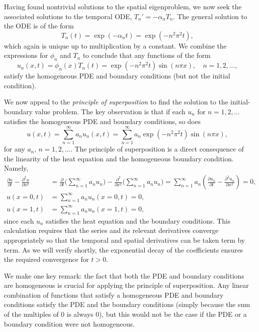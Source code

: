Having found nontrivial solutions to the spatial eigenproblem, we now seek the associated solutions to the temporal ODE, $T_n' = -\alpha_n T_n$. The general solution to the ODE is of the form
\[T_n(t) = \exp(-\alpha_n t) = \exp(-n^2\pi^2 t),\]
which again is unique up to multiplication by a constant. We combine the expressions for $\phi_n$ and $T_n$ to conclude that any functions of the form
\[u_n(x, t) = \phi_n(x) T_n(t) = \exp(-n^2\pi^2 t) \sin(n\pi x), \quad n = 1, 2, \dots,\]
satisfy the homogeneous PDE and boundary conditions (but not the initial condition).

We now appeal to the \textit{principle of superposition} to find the solution to the initial-boundary value problem. The key observation is that if each $u_n$ for $n = 1, 2, \dots$ satisfies the homogeneous PDE and boundary conditions, so does
\[u(x, t) = \sum_{n=1}^{\infty} a_n u_n(x, t) = \sum_{n=1}^{\infty} a_n \exp(-n^2\pi^2 t) \sin(n\pi x),\]
for any $a_n$, $n = 1, 2, \dots$. The principle of superposition is a direct consequence of the linearity of the heat equation and the homogeneous boundary condition. Namely,
\begin{align*}
    \frac{\partial u}{\partial t} - \frac{\partial^2 u}{\partial x^2} &= \frac{\partial}{\partial t}\Big(\sum_{n=1}^{\infty} a_n u_n\Big) - \frac{\partial^2}{\partial x^2}\Big(\sum_{n=1}^{\infty} a_n u_n\Big) = \sum_{n=1}^{\infty} a_n \left(\frac{\partial u_n}{\partial t} - \frac{\partial^2 u_n}{\partial x^2}\right) = 0, \\
    u(x = 0, t) &= \sum_{n=1}^{\infty} a_n u_n(x = 0, t) = 0, \\
    u(x = 1, t) &= \sum_{n=1}^{\infty} a_n u_n(x = 1, t) = 0,
\end{align*}
since each $u_n$ satisfies the heat equation and the boundary conditions. This calculation requires that the series and its relevant derivatives converge appropriately so that the temporal and spatial derivatives can be taken term by term. As we will verify shortly, the exponential decay of the coefficients ensures the required convergence for $t > 0$.

We make one key remark: the fact that both the PDE and boundary conditions are homogeneous is crucial for applying the principle of superposition. Any linear combination of functions that satisfy a homogeneous PDE and boundary conditions satisfy the PDE and the boundary conditions (simply because the sum of the multiples of $0$ is always $0$), but this would not be the case if the PDE or a boundary condition were not homogeneous.

